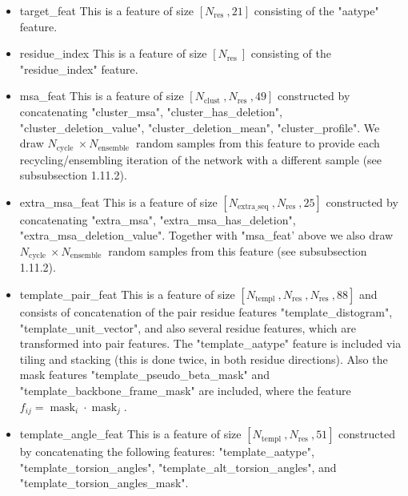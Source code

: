 \documentclass[10pt]{article}
\begin{document}
\begin{itemize}
  \item target\_feat This is a feature of size $\left[N_{\text {res }}, 21\right]$ consisting of the "aatype" feature.
  \item residue\_index This is a feature of size $\left[N_{\text {res }}\right]$ consisting of the "residue\_index" feature.
  \item msa\_feat This is a feature of size $\left[N_{\text {clust }}, N_{\text {res }}, 49\right]$ constructed by concatenating "cluster\_msa", "cluster\_has\_deletion", "cluster\_deletion\_value", "cluster\_deletion\_mean", "cluster\_profile". We draw $N_{\text {cycle }} \times N_{\text {ensemble }}$ random samples from this feature to provide each recycling/ensembling iteration of the network with a different sample (see subsubsection 1.11.2).
  \item extra\_msa\_feat This is a feature of size $\left[N_{\text {extra_seq }}, N_{\text {res }}, 25\right]$ constructed by concatenating "extra\_msa", "extra\_msa\_has\_deletion", "extra\_msa\_deletion\_value". Together with "msa\_feat' above we also draw $N_{\text {cycle }} \times N_{\text {ensemble }}$ random samples from this feature (see subsubsection 1.11.2).
  \item template\_pair\_feat This is a feature of size $\left[N_{\text {templ }}, N_{\text {res }}, N_{\text {res }}, 88\right]$ and consists of concatenation of the pair residue features "template\_distogram", "template\_unit\_vector", and also several residue features, which are transformed into pair features. The "template\_aatype" feature is included via tiling and stacking (this is done twice, in both residue directions). Also the mask features "template\_pseudo\_beta\_mask" and "template\_backbone\_frame\_mask" are included, where the feature $f_{i j}=\operatorname{mask}_{i} \cdot \operatorname{mask}_{j}$.
  \item template\_angle\_feat This is a feature of size $\left[N_{\text {templ }}, N_{\text {res }}, 51\right]$ constructed by concatenating the following features: "template\_aatype", "template\_torsion\_angles", "template\_alt\_torsion\_angles", and "template\_torsion\_angles\_mask".
\end{itemize}
\end{document}
